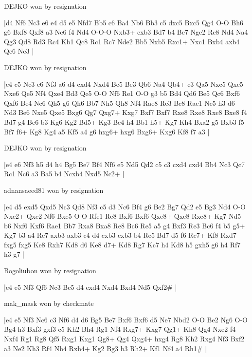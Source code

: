 DEJKO won by resignation

\makegametitle
|d4 Nf6 Nc3 e6 e4 d5 e5 Nfd7 Bb5 c6 Ba4 Nb6 Bb3 c5 dxc5 Bxc5 Qg4 O-O Bh6 g6 Bxf8 Qxf8 a3 Nc6 f4 Nd4 O-O-O Nxb3+ cxb3 Bd7 b4 Be7 Nge2 Rc8 Nd4 Na4 Qg3 Qd8 Rd3 Rc4 Kb1 Qc8 Rc1 Rc7 Nde2 Bb5 Nxb5 Rxc1+ Nxc1 Bxb4 axb4 Qc6 Nc3  |

\showboard

DEJKO won by resignation

\makegametitle
|e4 c5 Nc3 e6 Nf3 a6 d4 cxd4 Nxd4 Bc5 Be3 Qb6 Na4 Qb4+ c3 Qa5 Nxc5 Qxc5 Nxe6 Qe5 Nf4 Qxe4 Bd3 Qe5 O-O Nf6 Re1 O-O g3 b5 Bd4 Qd6 Be5 Qc6 Bxf6 Qxf6 Be4 Nc6 Qh5 g6 Qh6 Bb7 Nh5 Qh8 Nf4 Rae8 Re3 Bc8 Rae1 Ne5 h3 d6 Nd3 Be6 Nxe5 Qxe5 Bxg6 Qg7 Qxg7+ Kxg7 Bxf7 Bxf7 Rxe8 Rxe8 Rxe8 Bxe8 f4 Bd7 g4 Be6 b3 Kg6 Kg2 Bd5+ Kg3 Be4 h4 Bb1 h5+ Kg7 Kh4 Bxa2 g5 Bxb3 f5 Bf7 f6+ Kg8 Kg4 a5 Kf5 a4 g6 hxg6+ hxg6 Bxg6+ Kxg6 Kf8 f7 a3  |

\showboard

DEJKO won by resignation

\makegametitle
|e4 e6 Nf3 h5 d4 h4 Bg5 Be7 Bf4 Nf6 e5 Nd5 Qd2 c5 c3 cxd4 cxd4 Bb4 Nc3 Qc7 Rc1 Nc6 a3 Ba5 b4 Ncxb4 Nxd5 Nc2+  |

\showboard

adnansaeed81 won by resignation

\makegametitle
|e4 d5 exd5 Qxd5 Nc3 Qd8 Nf3 c5 d3 Nc6 Bf4 g6 Be2 Bg7 Qd2 e5 Bg3 Nd4 O-O Nxe2+ Qxe2 Nf6 Bxe5 O-O Rfe1 Re8 Bxf6 Bxf6 Qxe8+ Qxe8 Rxe8+ Kg7 Nd5 b6 Nxf6 Kxf6 Rae1 Bb7 Rxa8 Bxa8 Re8 Bc6 Re5 a5 g4 Bxf3 Re3 Bc6 f4 b5 g5+ Kg7 b3 a4 Re7 axb3 axb3 c4 d4 cxb3 cxb3 b4 Re5 Bd7 d5 f6 Re7+ Kf8 Rxd7 fxg5 fxg5 Ke8 Rxh7 Kd8 d6 Ke8 d7+ Kd8 Rg7 Kc7 h4 Kd8 h5 gxh5 g6 h4 Rf7 h3 g7  |

\showboard

Bogoliubon won by resignation

\makegametitle
|e4 e5 Nf3 Qf6 Nc3 Bc5 d4 exd4 Nxd4 Bxd4 Nd5 Qxf2\#  |

\showboard

mak\_mask won by checkmate

\makegametitle
|e4 e5 Nf3 Nc6 c3 Nf6 d4 d6 Bg5 Be7 Bxf6 Bxf6 d5 Ne7 Nbd2 O-O Be2 Ng6 O-O Bg4 h3 Bxf3 gxf3 c5 Kh2 Bh4 Rg1 Nf4 Rxg7+ Kxg7 Qg1+ Kh8 Qg4 Nxe2 f4 Nxf4 Rg1 Rg8 Qf5 Rxg1 Kxg1 Qg8+ Qg4 Qxg4+ hxg4 Rg8 Kh2 Rxg4 Nf3 Bxf2 a3 Ne2 Kh3 Rf4 Nh4 Rxh4+ Kg2 Bg3 b3 Rh2+ Kf1 Nf4 a4 Rh1\#  |


